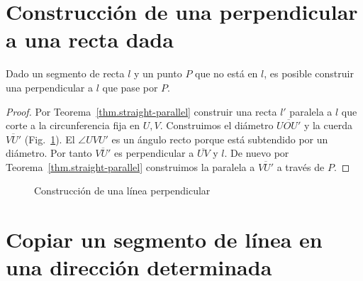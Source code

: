 \section{Construcción de una perpendicular a una recta dada}\label{s.perp}

\begin{theorem}\label{thm.straight-perp}
Dado un segmento de recta $l$ y un punto $P$ que no está en $l$, es posible construir una perpendicular a $l$ que pase por $P$.
\end{theorem}

\begin{proof}
Por Teorema~\ref{thm.straight-parallel} construir una recta $l'$ paralela a $l$ que corte a la circunferencia fija en $U,V$. Construimos el diámetro $\overline{UOU'}$ y la cuerda $\overline{VU'}$ (Fig.~\ref{f.se-perp}). El $\angle UVU'$ es un ángulo recto porque está subtendido por un diámetro. Por tanto $\overline{VU'}$ es perpendicular a $\overline{UV}$ y $l$. De nuevo por Teorema~\ref{thm.straight-parallel} construimos la paralela a $\overline{VU'}$ a través de $P$.
\end{proof}

\begin{figure}[htb]
\begin{center}
\end{center}
\caption{Construcción de una línea perpendicular}\label{f.se-perp}
\end{figure}

\section{Copiar un segmento de línea en una dirección determinada}\label{s.copy}

